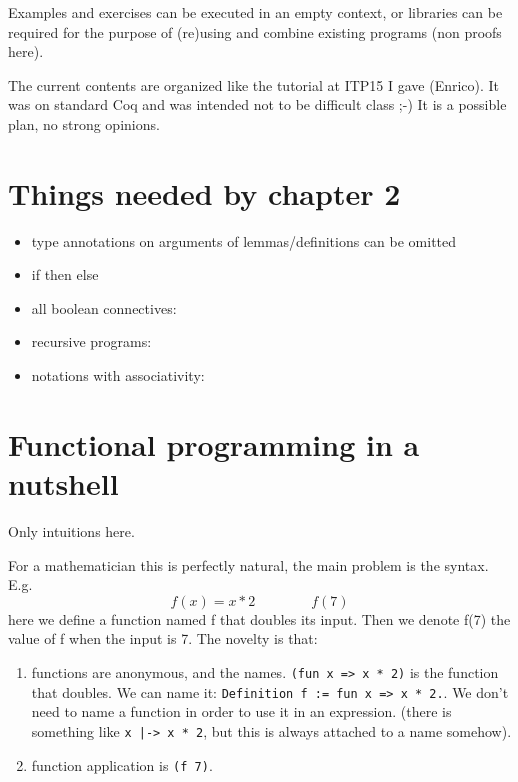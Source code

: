 Examples and exercises can be executed in an empty context, or
libraries can be required for the purpose of (re)using and combine existing
programs (non proofs here).

The current contents are organized like the tutorial at ITP15 I gave (Enrico).
It was on standard Coq and was intended not to be difficult class ;-)
It is a possible plan, no strong opinions.

\section*{Things needed by chapter 2}
\begin{itemize}
\item type annotations on arguments of lemmas/definitions can be omitted
\item if then else
\item all boolean connectives: 
\item recursive programs: 
\item notations with associativity: 
\end{itemize}


\section{Functional programming in a nutshell}
Only intuitions here.

For a mathematician this is perfectly natural, the main problem is the syntax.  E.g.
$$f(x) = x * 2\qquad\qquad f(7)$$
here we define a function named f that doubles its input.  Then we denote f(7) the value of f
when the input is 7. The novelty is that:
\begin{enumerate}
\item functions are anonymous, and the names. \verb+(fun x => x * 2)+ is the function that
	doubles.  We can name it: \verb+Definition f := fun x => x * 2.+.  We don't need to
	name a function in order to use it in an expression. (there is something like
	\verb+x |-> x * 2+, but this is always attached to a name somehow).
\item function application is \verb+(f 7)+.
\end{enumerate}

